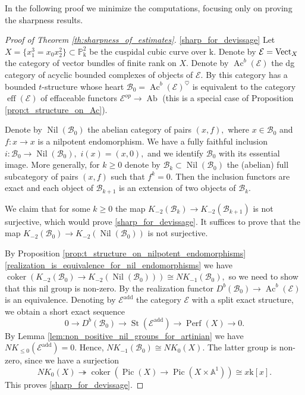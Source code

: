 \documentclass[11pt,leqno]{amsart}
\numberwithin{equation}{section}
\def\A{{\mathbb A}}
\def\PP{{\mathbb P}}
\def\h{\operatorname{h}}
\def\Hom{\operatorname{Hom}}
\def\Pic{\operatorname{Pic}}
\newcommand{\onto}{\twoheadrightarrow}
\newcommand{\eff}{\operatorname{eff}}
\newcommand{\St}{\operatorname{St}}
\newcommand{\mk}{\mathrm k}
\newcommand{\cF}{{\mathcal F}}
\newcommand{\cB}{{\mathcal B}}
\newcommand{\cE}{{\mathcal E}}
\newcommand{\Fun}{\operatorname{Fun}}
\newcommand{\Ab}{\operatorname{Ab}}
\newcommand{\Perf}{\operatorname{Perf}}
\newcommand{\coker}{\operatorname{coker}}
\newcommand{\add}{\operatorname{add}}
\newcommand{\Vect}{{\rm Vect}}
\newcommand{\Ac}{\operatorname{Ac}}
\newcommand{\Nil}{\operatorname{Nil}}
\begin{document}
In the following proof we minimize the computations, focusing only on proving the sharpness results.

\begin{proof}[Proof of Theorem \ref{th:sharpness_of_estimates}]
\ref{sharp_for_devissage} Let $X=\{x_1^3 = x_0 x_2^2\}\subset \PP^2_{\mk}$ be the cuspidal cubic curve over $\mk.$ Denote by $\cE=\Vect_X$ the category of vector bundles of finite rank on $X.$ Denote by $\Ac^b(\cE)$ the dg category of acyclic bounded complexes of objects of $\cE.$ By \cite[Lemma 1.2]{Nee21} this category has a bounded $t$-structure whose heart $\cB_0=\Ac^b(\cE)^{\heartsuit}$ is equivalent to the category $\eff(\cE)$ of effaceable functors $\cE^{op}\to\Ab$ (this is a special case of Proposition \ref{prop:t_structure_on_Ac}).

Denote by $\Nil(\cB_0)$ the abelian category of pairs $(x,f),$ where $x\in\cB_0$ and $f:x\to x$ is a nilpotent endomorphism. We have a fully faithful inclusion $i:\cB_0\to\Nil(\cB_0),$ $i(x)=(x,0),$ and we identify $\cB_0$ with its essential image. More generally, for $k\geq 0$ denote by $\cB_k\subset\Nil(\cB_0)$ the (abelian) full subcategory of pairs $(x,f)$ such that $f^k=0.$ Then the inclusion functors are exact and each object of $\cB_{k+1}$ is an extension of two objects of $\cB_k.$

We claim that for some $k\geq 0$ the map $K_{-2}(\cB_k)\to K_{-2}(\cB_{k+1})$ is not surjective, which would prove \ref{sharp_for_devissage}. It suffices to prove that the map $K_{-2}(\cB_0)\to K_{-2}(\Nil(\cB_0))$ is not surjective. 

By Proposition \ref{prop:t_structure_on_nilpotent_endomorphisms} \ref{realization_is_equivalence_for_nil_endomorphisms} we have $\coker(K_{-2}(\cB_0)\to K_{-2}(\Nil(\cB_0)))\cong NK_{-1}(\cB_0),$ so we need to show that this nil group is non-zero. By \cite[Proposition 2.4]{Nee21} the realization functor $D^b(\cB_0)\to \Ac^b(\cE)$ is an equivalence. Denoting by $\cE^{\add}$ the category $\cE$ with a split exact structure, we obtain a short exact sequence
\begin{equation*}
0\to D^b(\cB_0)\to \St(\cE^{\add})\to \Perf(X)\to 0.
\end{equation*}
By Lemma \ref{lem:non_positive_nil_groups_for_artinian} we have $NK_{\leq 0}(\cE^{\add})=0.$ Hence, $NK_{-1}(\cB_0)\cong NK_0(X).$ The latter group is non-zero, since we have a surjection
\begin{equation*}
NK_0(X)\onto \coker(\Pic(X)\to \Pic(X\times \A^1))\cong x\mk[x].
\end{equation*} 
This proves \ref{sharp_for_devissage}.


\end{proof}
\end{document}
